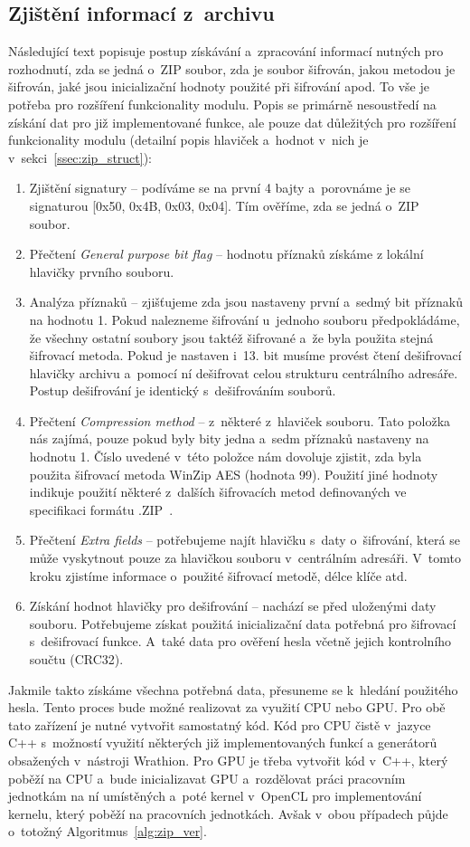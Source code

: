 \subsection{Zjištění informací z~archivu}
Následující text popisuje postup získávání a~zpracování informací nutných pro rozhodnutí, zda se
jedná o~ZIP soubor, zda je soubor šifrován, jakou metodou je šifrován, jaké jsou inicializační
hodnoty použité při šifrování apod. To vše je potřeba pro rozšíření funkcionality modulu. Popis se
primárně nesoustředí na získání dat pro již implementované funkce, ale pouze dat důležitých pro
rozšíření funkcionality modulu (detailní popis hlaviček a~hodnot v~nich je
v~sekci~\ref{ssec:zip_struct}):
\begin{enumerate}
    \item Zjištění signatury -- podíváme se na první 4 bajty a~porovnáme je se signaturou [0x50,
	0x4B, 0x03, 0x04]. Tím ověříme, zda se jedná o~ZIP soubor.
    \item Přečtení {\it General purpose bit flag} -- hodnotu příznaků získáme z lokální hlavičky
	prvního souboru.
    \item Analýza příznaků -- zjišťujeme zda jsou nastaveny první a~sedmý bit příznaků na hodnotu
	1. Pokud nalezneme šifrování u~jednoho souboru předpokládáme, že všechny ostatní soubory
	jsou taktéž šifrované a~že byla použita stejná šifrovací metoda. Pokud je nastaven i~13.
	bit musíme provést čtení dešifrovací hlavičky archivu a~pomocí ní dešifrovat celou
	strukturu centrálního adresáře. Postup dešifrování je identický s~dešifrováním souborů.
    \item Přečtení {\it Compression method} -- z~některé z~hlaviček %
	souboru. Tato položka nás zajímá, pouze pokud byly bity jedna a~sedm příznaků nastaveny na
	hodnotu 1. Číslo uvedené v~této položce nám dovoluje zjistit, zda byla použita šifrovací
	metoda WinZip AES (hodnota 99). Použití jiné hodnoty indikuje použití některé z~dalších
	šifrovacích metod definovaných ve specifikaci formátu .ZIP~\cite{PKWARE:2014}.
    \item Přečtení {\it Extra fields} -- potřebujeme najít hlavičku s~daty o~šifrování, která se
	může vyskytnout pouze za hlavičkou souboru v~centrálním adresáři. V~tomto kroku zjistíme
	informace o~použité šifrovací metodě, délce klíče atd.
    \item Získání hodnot hlavičky pro dešifrování -- nachází se před uloženými daty souboru.
	Potřebujeme získat použitá inicializační data potřebná pro šifrovací s~dešifrovací funkce.
	A~také data pro ověření hesla včetně jejich kontrolního součtu (CRC32).
\end{enumerate}
Jakmile takto získáme všechna potřebná data, přesuneme se k~hledání použitého hesla. Tento proces
bude možné realizovat za využití CPU nebo GPU. Pro obě tato zařízení je nutné vytvořit samostatný
kód. Kód pro CPU čistě v~jazyce C++ s~možností využití některých již implementovaných funkcí a
generátorů obsažených v~nástroji Wrathion. Pro GPU je třeba vytvořit kód v~C++, který poběží na
CPU a~bude inicializavat GPU a~rozdělovat práci pracovním jednotkám na ní umístěných a~poté kernel
v~OpenCL pro implementování kernelu, který poběží na pracovních jednotkách. Avšak v~obou
případech půjde o~totožný Algoritmus~\ref{alg:zip_ver}.

